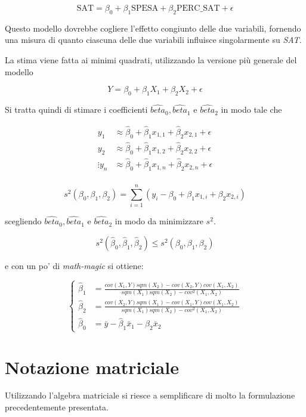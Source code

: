 $$
\text{SAT} = \beta_0 + \beta_1\text{SPESA}+\beta_2\text{PERC\_SAT} + \epsilon
$$

Questo modello dovrebbe cogliere l'effetto congiunto delle due variabili, fornendo una misura di quanto ciascuna delle due variabili influisce singolarmente su \textit{SAT}.

La stima viene fatta ai minimi quadrati, utilizzando la versione più generale del modello

$$
Y = \beta_0 + \beta_1 X_1+\beta_2X_2 + \epsilon
$$

Si tratta quindi di stimare i coefficienti $ \hat{beta}_0, \hat{beta}_1 $ e $ \hat{beta}_2 $ in modo tale che

\begin{align*}
y_1 &\approx \hat{\beta}_0 + \hat{\beta}_1 x_{1,1}+\hat{\beta}_2 x_{2,1}+ \epsilon\\
y_2 &\approx \hat{\beta}_0 + \hat{\beta}_1 x_{1,2}+\hat{\beta}_2 x_{2,2}+ \epsilon\\
\vdots
y_n &\approx \hat{\beta}_0 + \hat{\beta}_1 x_{1,n}+\hat{\beta}_2 x_{2,n}+ \epsilon\\
\end{align*}

$$
s^2(\beta_0, \beta_1, \beta_2) = \sum\limits_{i=1}^n(y_i - \beta_0 + \beta_1 x_{1,i}+\beta_2 x_{2,i} )
$$

scegliendo $ \hat{beta}_0, \hat{beta}_1 $ e $ \hat{beta}_2 $ in modo da minimizzare $ s^2 $.

$$
s^2(\hat{\beta}_0 , \hat{\beta}_1 , \hat{\beta}_2) \leq s^2(\beta_0, \beta_1, \beta_2)
$$


e con un po' di \textit{math-magic} si ottiene:

$$
\begin{cases}
\hat{\beta}_1 &= \frac{cov(X_1,Y)sqm(X_2) - cov(X_2, Y)cov(X_1,X_2)}{sqm(X_1)sqm(X_2)- cov^2(X_1,X_2)} \\
\hat{\beta}_2 &= \frac{cov(X_2,Y)sqm(X_1) - cov(X_1, Y)cov(X_1,X_2)}{sqm(X_1)sqm(X_2)- cov^2(X_1,X_2)}  \\
\hat{\beta}_0 &= \bar{y} - \hat{\beta}_1\bar{x}_1 - \hat{\beta}_2\bar{x}_2
\end{cases}
$$

\section{Notazione matriciale}

Utilizzando l'algebra matriciale si riesce a semplificare di molto la formulazione precedentemente presentata.

